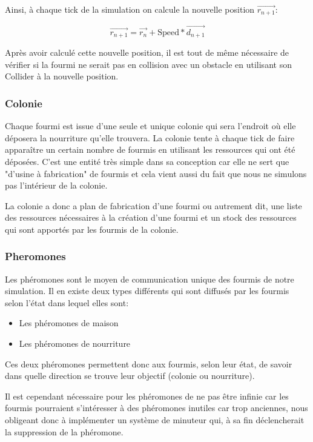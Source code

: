 \documentclass{EPUProjetDi}
\begin{document}
Ainsi, à chaque tick de la simulation on calcule la nouvelle position $\vec{r_{n+1}}$:

\begin{equation}
    \vec{r_{n+1}} = \vec{r_{n}} + \text{Speed} * \vec{d_{n+1}}
\end{equation}

Après avoir calculé cette nouvelle position, il est tout de même nécessaire de vérifier si la fourmi ne serait pas en collision avec un obstacle en
utilisant son Collider à la nouvelle position. 

\subsubsection{Colonie}

Chaque fourmi est issue d'une seule et unique colonie qui sera l'endroit où elle déposera la nourriture qu'elle trouvera. La colonie tente à chaque tick de
faire apparaître un certain nombre de fourmis en utilisant les ressources qui ont été déposées. C'est une entité très simple dans sa conception car elle
ne sert que "d'usine à fabrication" de fourmis et cela vient aussi du fait que nous ne simulons pas l'intérieur de la colonie.

La colonie a donc a plan de fabrication d'une fourmi ou autrement dit, une liste des ressources nécessaires à la création d'une fourmi et un stock
des ressources qui sont apportés par les fourmis de la colonie.

\subsubsection{Pheromones}

Les phéromones sont le moyen de communication unique des fourmis de notre simulation. Il en existe deux types différents qui sont diffusés par
les fourmis selon l'état dans lequel elles sont:
\begin{itemize}
    \item Les phéromones de maison
    \item Les phéromones de nourriture
\end{itemize}

Ces deux phéromones permettent donc aux fourmis, selon leur état, de savoir dans quelle direction se trouve leur objectif (colonie ou nourriture).

Il est cependant nécessaire pour les phéromones de ne pas être infinie car les fourmis pourraient s'intéresser à des phéromones inutiles car trop anciennes, 
nous obligeant donc à implémenter un système de minuteur qui, à sa fin déclencherait la suppression de la phéromone.
\end{document}
